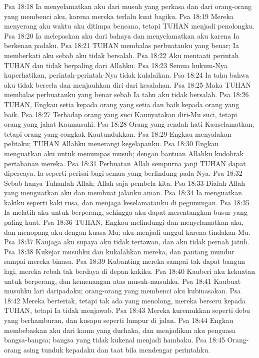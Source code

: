 Psa 18:18  Ia menyelamatkan aku dari musuh yang perkasa dan dari orang-orang yang membenci aku, karena mereka terlalu kuat bagiku.
Psa 18:19  Mereka menyerang aku waktu aku ditimpa bencana, tetapi TUHAN menjadi penolongku.
Psa 18:20  Ia melepaskan aku dari bahaya dan menyelamatkan aku karena Ia berkenan padaku.
Psa 18:21  TUHAN membalas perbuatanku yang benar; Ia memberkati aku sebab aku tidak bersalah.
Psa 18:22  Aku mentaati perintah TUHAN dan tidak berpaling dari Allahku.
Psa 18:23  Semua hukum-Nya kuperhatikan, perintah-perintah-Nya tidak kulalaikan.
Psa 18:24  Ia tahu bahwa aku tidak bercela dan menjauhkan diri dari kesalahan.
Psa 18:25  Maka TUHAN membalas perbuatanku yang benar sebab Ia tahu aku tidak bersalah.
Psa 18:26  TUHAN, Engkau setia kepada orang yang setia dan baik kepada orang yang baik.
Psa 18:27  Terhadap orang yang suci Kaunyatakan diri-Mu suci, tetapi orang yang jahat Kaumusuhi.
Psa 18:28  Orang yang rendah hati Kauselamatkan, tetapi orang yang congkak Kautundukkan.
Psa 18:29  Engkau menyalakan pelitaku; TUHAN Allahku menerangi kegelapanku.
Psa 18:30  Engkau menguatkan aku untuk menumpas musuh; dengan bantuan Allahku kudobrak pertahanan mereka.
Psa 18:31  Perbuatan Allah sempurna janji TUHAN dapat dipercaya. Ia seperti perisai bagi semua yang berlindung pada-Nya.
Psa 18:32  Sebab hanya Tuhanlah Allah; Allah saja pembela kita.
Psa 18:33  Dialah Allah yang menguatkan aku dan membuat jalanku aman.
Psa 18:34  Ia menguatkan kakiku seperti kaki rusa, dan menjaga keselamatanku di pegunungan.
Psa 18:35  Ia melatih aku untuk berperang, sehingga aku dapat merentangkan busur yang paling kuat.
Psa 18:36  TUHAN, Engkau melindungi dan menyelamatkan aku, dan menopang aku dengan kuasa-Mu; aku menjadi unggul karena tindakan-Mu.
Psa 18:37  Kaujaga aku supaya aku tidak tertawan, dan aku tidak pernah jatuh.
Psa 18:38  Kukejar musuhku dan kukalahkan mereka, dan pantang mundur sampai mereka binasa.
Psa 18:39  Kubanting mereka sampai tak dapat bangun lagi, mereka rebah tak berdaya di depan kakiku.
Psa 18:40  Kauberi aku kekuatan untuk berperang, dan kemenangan atas musuh-musuhku.
Psa 18:41  Kaubuat musuhku lari daripadaku; orang-orang yang membenci aku kubinasakan.
Psa 18:42  Mereka berteriak, tetapi tak ada yang menolong, mereka berseru kepada TUHAN, tetapi Ia tidak menjawab.
Psa 18:43  Mereka kuremukkan seperti debu yang berhamburan, dan kusapu seperti lumpur di jalan.
Psa 18:44  Engkau membebaskan aku dari kaum yang durhaka, dan menjadikan aku penguasa bangsa-bangsa; bangsa yang tidak kukenal menjadi hambaku.
Psa 18:45  Orang-orang asing tunduk kepadaku dan taat bila mendengar perintahku.

